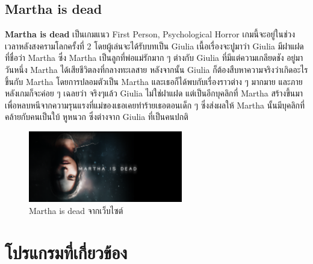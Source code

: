 \subsection{Martha is dead}
\subsubitem \textbf{Martha is dead} \cite{home-sweet-home:theory} เป็นเกมแนว First Person, Psychological Horror เกมนี้จะอยู่ในช่วงเวลาหลังสงครามโลกครั้งที่ 2 โดยผู้เล่นจะได้รับบทเป็น Giulia เนื้อเรื่องจะปูมาว่า Giulia มีฝาแฝดที่ชื่อว่า Martha ซึ่ง Martha เป็นลูกที่พ่อแม่รักมาก ๆ ต่างกับ Giulia ที่มีแต่ความเกลียดชัง อยู่มาวันหนึ่ง Martha ได้เสียชีวิตลงที่กลางทะเลสาย หลังจากนั้น Giulia ก็ต้องสืบหาความจริงว่าเกิดอะไรขึ้นกับ Martha โดยการปลอมตัวเป็น Martha และเธอก็ได้พบกับเรื่องราวต่าง ๆ มากมาย และภายหลังเกมก็จะค่อย ๆ เฉลยว่า จริงๆแล้ว Giulia ไม่ใช่ฝาแฝด แต่เป็นอีกบุคลิกที่ Martha สร้างขึ้นมาเพื่อหลบหนีจากความรุนแรงที่แม่ของเธอเคยทำร้ายเธอตอนเด็ก ๆ ซึ่งส่งผลให้ Martha นั้นมีบุคลิกที่คล้ายกับคนเป็นใบ้ หูหนวก ซึ่งต่างจาก Giulia ที่เป็นคนปกติ
\begin{figure}[h]
  \centering
  \includegraphics[width=0.6\textwidth, height=0.2\textheight]{Images/martha_is_dead.png}
  \caption{Martha is dead จากเว็บไซต์}\label{martha_is_dead}
\end{figure}


\section{โปรแกรมที่เกี่ยวข้อง}
